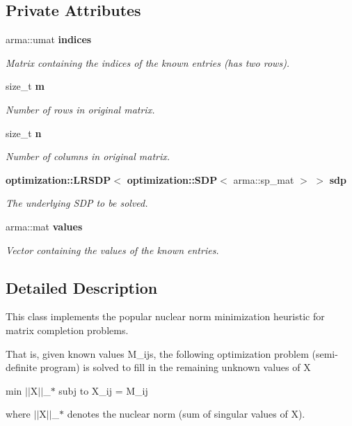 \subsection*{Private Attributes}
\begin{DoxyCompactItemize}
\item 
arma\+::umat {\bf indices}
\begin{DoxyCompactList}\small\item\em Matrix containing the indices of the known entries (has two rows). \end{DoxyCompactList}\item 
size\+\_\+t {\bf m}
\begin{DoxyCompactList}\small\item\em Number of rows in original matrix. \end{DoxyCompactList}\item 
size\+\_\+t {\bf n}
\begin{DoxyCompactList}\small\item\em Number of columns in original matrix. \end{DoxyCompactList}\item 
{\bf optimization\+::\+L\+R\+S\+DP}$<$ {\bf optimization\+::\+S\+DP}$<$ arma\+::sp\+\_\+mat $>$ $>$ {\bf sdp}
\begin{DoxyCompactList}\small\item\em The underlying S\+DP to be solved. \end{DoxyCompactList}\item 
arma\+::mat {\bf values}
\begin{DoxyCompactList}\small\item\em Vector containing the values of the known entries. \end{DoxyCompactList}\end{DoxyCompactItemize}


\subsection{Detailed Description}
This class implements the popular nuclear norm minimization heuristic for matrix completion problems. 

That is, given known values M\+\_\+ij\textquotesingle{}s, the following optimization problem (semi-\/definite program) is solved to fill in the remaining unknown values of X

min $\vert$$\vert$\+X$\vert$$\vert$\+\_\+$\ast$ subj to X\+\_\+ij = M\+\_\+ij

where $\vert$$\vert$\+X$\vert$$\vert$\+\_\+$\ast$ denotes the nuclear norm (sum of singular values of X).

